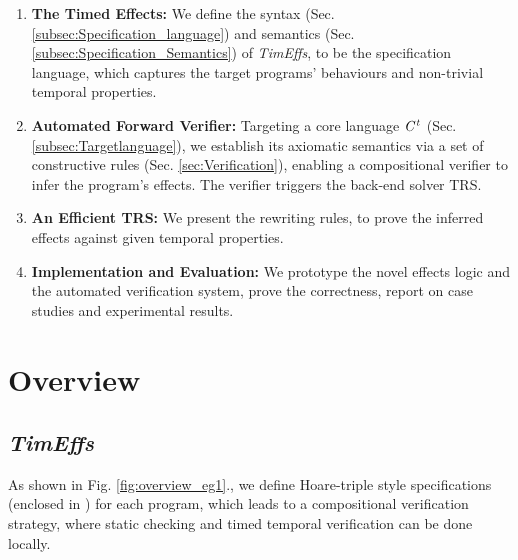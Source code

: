 \documentclass[acmsmall,10pt,review]{acmart}
\newcommand{\timedEffects}{\emph{TimEffs}}
\newcommand{\code}[1]{{\tt{\ensuremath{\m{#1}}}}}
\newcommand{\m}{\mathit}
\newcommand\figref[1]{Fig. \textcolor{black}{\ref{#1}}.}
\newcommand\secref[1]{Sec. \textcolor{black}{\ref{#1}}}
\newcommand{\timedL}{\code{C^{t}}}
\begin{document}
\begin{enumerate}
\item \textbf{The Timed Effects:} We define the syntax 
({\secref{subsec:Specification_language}}) and semantics 
({\secref{subsec:Specification_Semantics}}) of \timedEffects, to be the 
specification language, which captures the target programs' behaviours 
and non-trivial temporal properties.

\item \textbf{Automated Forward Verifier:} Targeting a core language 
\code{\timedL} ({\secref{subsec:Targetlanguage}}), we 
establish its axiomatic semantics via a set of constructive rules 
(\secref{sec:Verification}), enabling a compositional verifier to 
infer the program's effects. The verifier triggers the back-end 
solver TRS. 


\item \textbf{An Efficient TRS:}
We present the rewriting rules, to prove 
the inferred effects against given temporal properties. %


\item \textbf{Implementation and Evaluation:} We prototype the novel 
effects logic and the automated verification system, %
prove the correctness, report on case studies and experimental results. 


\end{enumerate} 




\section{Overview}\label{sec:Overview}

\subsection{\timedEffects}
As shown in \figref{fig:overview_eg1}, we define Hoare-triple style specifications (enclosed in \textcolor{darklavender}{}) for each program, which leads to a compositional verification strategy, where static checking and timed temporal verification can be done locally. %
\end{document}
